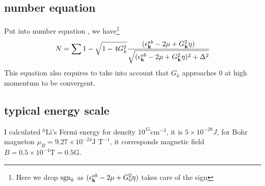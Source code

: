 \subsection{number equation}
Put  into number equation , we have\footnote{Here we drop $\text{sgn}_{k}$ as $(\epsilon^{ab}_{\mathbf{k}}-2\mu+  G_{0}^2\eta)$ takes care of the sign}
\begin{equation}\label{eq:20101011:number}
N=\sum{1-\sqrt{1-4G_{k}^{2}}\frac{(\epsilon^{ab}_{\ensuremath{\mathbf{k}}}-2\mu+  G_{\ensuremath{\mathbf{k}}}^2\eta)}{{\sqrt{{(\epsilon^{ab}_{\ensuremath{\mathbf{k}}}-2\mu+  G_{\ensuremath{\mathbf{k}}}^2\eta)^{2}+\Delta^{2}}}}}}
\end{equation}
This equation also requires to take into account that $G_{k}$ approaches 0 at high momentum to be convergent.  
\subsection{typical energy scale}
I calculated $^{6}\text{Li}$'s Fermi energy for density $10^{15}\text{cm}^{-3}$, it is $5\times10^{-28}J$, for Bohr magneton $\mu_{B}=9.27\times10^{-24}\text{J T}^{-1}$, it corresponds magnetic field $B=0.5\times10^{-4}\text{T}=0.5\text{G}$.

